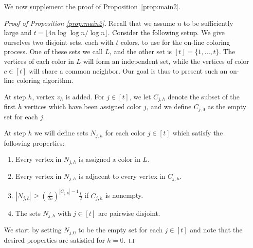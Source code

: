 \documentclass[10pt]{amsart}
\theoremstyle{definition}
\begin{document}
We now supplement the proof of Proposition~\ref{prop:main2}.
\begin{proof}[Proof of Proposition \ref{prop:main2}]

Recall that we assume $n$ to be sufficiently large and $t=\lfloor 4n \log \log n / \log n\rfloor$. Consider the following setup.  We give ourselves two disjoint sets, each with $t$ colors, to use for the on-line coloring process. One
of these sets we call $L$, and the other set is $[t]=\{1,\ldots,t\}$. The vertices of each color in $L$ will form an
independent set, while the vertices of color $c \in [t]$ will share a
common neighbor.  Our goal is thus to present such an on-line coloring algorithm.

At step $h$, vertex $v_h$ is added. For $j \in [t]$, we let $C_{j,h}$ denote
the subset of the first $h$ vertices which have been assigned color $j$, and we define
$C_{j,0}$ as the empty set for each $j$. 

At step $h$ we will define sets $N_{j,h}$ for each color $j \in [t]$ which
satisfy the following properties: 

\begin{enumerate}
\item Every vertex in $N_{j,h}$ is assigned a color in $L$.
\item Every vertex in $N_{j,h}$ is adjacent to every vertex in $C_{j,h}$. 
\item $|N_{j,h}| \geq \left(\frac{t}{2n}\right)^{|C_{j,h}|-1}\frac{t}{2}$
if $C_{j,h}$ is nonempty.
\item The sets $N_{j,h}$ with $j \in [t]$ are pairwise disjoint. 
\end{enumerate}

We start by setting $N_{j,0}$ to be the empty set for each $j \in [t]$ and note that the desired properties are satisfied for $h=0$.  


\end{proof}
\end{document}
